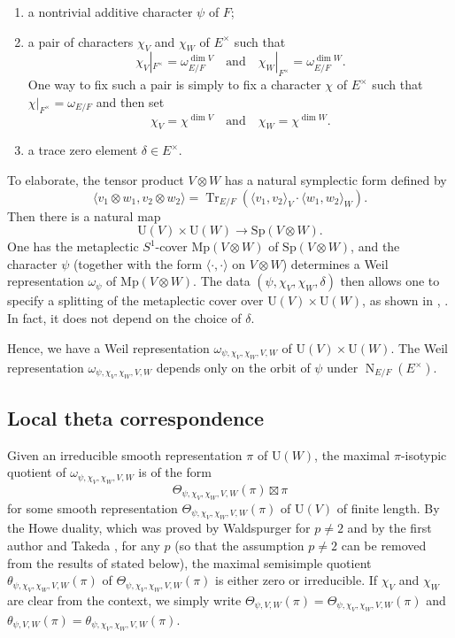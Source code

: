 \documentclass[11pt]{amsart}
\numberwithin{equation}{section}
\theoremstyle{plain}
\theoremstyle{definition}
\theoremstyle{remark}
\def\N{\operatorname{N}}
\def\Tr{\operatorname{Tr}}
\def\Mp{\mathrm{Mp}}
\def\Sp{\mathrm{Sp}}
\def\U{\mathrm{U}}
\begin{document}
\begin{enumerate}
\item a nontrivial additive character $\psi$ of $F$;

\item a pair of characters $\chi_V$ and $\chi_W$ of $E^{\times}$ such that
\[  \chi_V |_{F^{\times}}  = \omega_{E/F}^{\dim V} \quad \text{and} \quad \chi_W|_{F^{\times}} = \omega_{E/F}^{\dim W}. \]
One way to fix such a pair is simply to fix a character $\chi$ of $E^{\times}$ such that $\chi|_{F^{\times}} = \omega_{E/F}$ and then set 
\[  \chi_V = \chi^{\dim V} \quad \text{and} \quad \chi_W = \chi^{\dim W}. \]

\item a trace zero element $\delta \in E^{\times}$.
\end{enumerate}
To elaborate, the tensor product $V \otimes W$ has a natural symplectic form defined by 
\[  \langle v_1 \otimes w_1,  v_2 \otimes w_2 \rangle =  \Tr_{E/F}(\langle v_1,v_2 \rangle_V \cdot \langle w_1, w_2 \rangle_W). \]
Then there is a natural map
\[   \U(V) \times \U(W) \longrightarrow \Sp(V \otimes W). \]
One has the metaplectic $S^1$-cover $\Mp(V \otimes W)$ of $\Sp(V \otimes W)$, and the character $\psi$ (together with the form $\langle \cdot, \cdot \rangle$ on $V \otimes W$) determines a Weil representation $\omega_{\psi}$ of $\Mp(V \otimes W)$.
The data $(\psi, \chi_V,\chi_W, \delta)$ then allows one to specify a splitting of the metaplectic cover over $\U(V) \times \U(W)$, as shown in \cite{k}, \cite{hks}.
In fact, it does not depend on the choice of $\delta$.

Hence, we have a Weil representation $\omega_{\psi, \chi_V, \chi_W, V,W}$ of $\U(V) \times \U(W)$. The Weil representation $\omega_{\psi, \chi_V, \chi_W, V,W}$ depends only on the orbit of $\psi$ under $\N_{E/F}(E^{\times})$.

\subsection{Local theta correspondence}

Given an irreducible smooth representation $\pi$ of $\U(W)$, the maximal $\pi$-isotypic quotient of $\omega_{\psi, \chi_V, \chi_W, V,W}$ is of the form
\[
 \Theta_{\psi, \chi_V, \chi_W, V,W}(\pi) \boxtimes \pi
\]
for some smooth representation $\Theta_{\psi, \chi_V, \chi_W, V,W}(\pi)$ of $\U(V)$ of finite length.
By the Howe duality, which was proved by Waldspurger \cite{w} for $p \ne 2$ and by the first author and Takeda \cite{gt1}, \cite{gt2} for any $p$ (so that the assumption $p \ne 2$ can be removed from the results of \cite{gi} stated below),
the maximal semisimple quotient $\theta_{\psi, \chi_V, \chi_W, V,W}(\pi)$ of $\Theta_{\psi, \chi_V, \chi_W, V,W}(\pi)$ is either zero or irreducible.
If $\chi_V$ and $\chi_W$ are clear from the context, we simply write $\Theta_{\psi, V,W}(\pi) = \Theta_{\psi, \chi_V, \chi_W, V,W}(\pi)$ and $\theta_{\psi, V,W}(\pi) = \theta_{\psi, \chi_V, \chi_W, V,W}(\pi)$.
\end{document}

